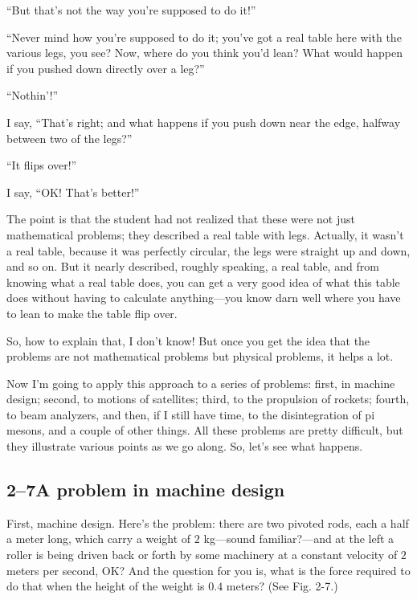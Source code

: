 \documentclass[11pt,oneside]{article}
\begin{document}
``But that's not the way you're supposed to do it!''\par

``Never mind how you're supposed to do it; you've got a real table here with the various legs, you see? Now, where do you think you'd lean? What would happen if you pushed down directly over a leg?''\par

``Nothin'!''\par

I say, ``That's right; and what happens if you push down near the edge, halfway between two of the legs?''\par

``It flips over!''\par

I say, ``OK! That's better!''\par

The point is that the student had not realized that these were not just mathematical problems; they described a real table with legs. Actually, it wasn't a real table, because it was perfectly circular, the legs were straight up and down, and so on. But it nearly described, roughly speaking, a real table, and from knowing what a real table does, you can get a very good idea of what this table does without having to calculate anything---you know darn well where you have to lean to make the table flip over.\par

So, how to explain that, I don't know! But once you get the idea that the problems are not mathematical problems but physical problems, it helps a lot.\par

Now I'm going to apply this approach to a series of problems: first, in machine design; second, to motions of satellites; third, to the propulsion of rockets; fourth, to beam analyzers, and then, if I still have time, to the disintegration of pi mesons, and a couple of other things. All these problems are pretty difficult, but they illustrate various points as we go along. So, let's see what happens.\par

\subsection*{2--7A problem in machine design}

First, machine design. Here's the problem: there are two pivoted rods, each a half a meter long, which carry a weight of \(2\) kg---sound familiar?---and at the left a roller is being driven back or forth by some machinery at a constant velocity of \(2\) meters per second, OK? And the question for you is, what is the force required to do that when the height of the weight is \(\mathrm{0.4}\) meters? (See Fig. 2-7.)\par
\end{document}
